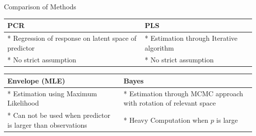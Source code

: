 \documentclass[ignorenonframetext,]{beamer}
\begin{document}
\begin{frame}{Comparison of Methods}

\begin{longtable}[]{@{}ll@{}}
\toprule
\begin{minipage}[b]{0.53\columnwidth}\raggedright\strut
PCR
\strut\end{minipage} &
\begin{minipage}[b]{0.41\columnwidth}\raggedright\strut
PLS
\strut\end{minipage}\tabularnewline
\midrule
\endhead
\begin{minipage}[t]{0.53\columnwidth}\raggedright\strut
* Regression of response on latent space of predictor
\strut\end{minipage} &
\begin{minipage}[t]{0.41\columnwidth}\raggedright\strut
* Estimation through Iterative algorithm
\strut\end{minipage}\tabularnewline
\begin{minipage}[t]{0.53\columnwidth}\raggedright\strut
* No strict assumption
\strut\end{minipage} &
\begin{minipage}[t]{0.41\columnwidth}\raggedright\strut
* No strict assumption
\strut\end{minipage}\tabularnewline
\bottomrule
\end{longtable}

\begin{longtable}[]{@{}ll@{}}
\toprule
\begin{minipage}[b]{0.45\columnwidth}\raggedright\strut
Envelope (MLE)
\strut\end{minipage} &
\begin{minipage}[b]{0.49\columnwidth}\raggedright\strut
Bayes
\strut\end{minipage}\tabularnewline
\midrule
\endhead
\begin{minipage}[t]{0.45\columnwidth}\raggedright\strut
* Estimation using Maximum Likelihood
\strut\end{minipage} &
\begin{minipage}[t]{0.49\columnwidth}\raggedright\strut
* Estimation through MCMC approach with rotation of relevant space
\strut\end{minipage}\tabularnewline
\begin{minipage}[t]{0.45\columnwidth}\raggedright\strut
* Can not be used when predictor is larger than observations
\strut\end{minipage} &
\begin{minipage}[t]{0.49\columnwidth}\raggedright\strut
* Heavy Computation when \(p\) is large
\strut\end{minipage}\tabularnewline
\bottomrule
\end{longtable}

\end{frame}
\end{document}
